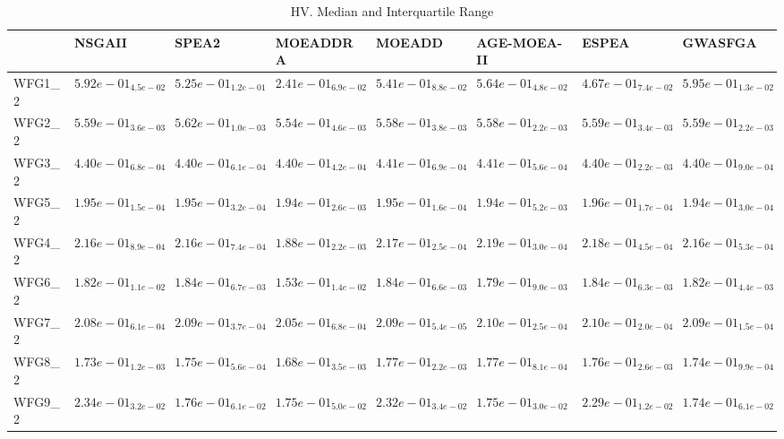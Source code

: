 \documentclass{article}
\begin{document}
\begin{table}
\caption{HV. Median and Interquartile Range}
\label{table: HV}
\centering
\begin{scriptsize}
\begin{tabular}{llllllll}
\hline & NSGAII & SPEA2 & MOEADDRA & MOEADD & AGE-MOEA-II & ESPEA &  GWASFGA\\
\hline 
WFG1\_2 & \cellcolor{gray25}$  5.92e-01_{ 4.5e-02}$ & $  5.25e-01_{ 1.2e-01}$ & $  2.41e-01_{ 6.9e-02}$ & $  5.41e-01_{ 8.8e-02}$ & $  5.64e-01_{ 4.8e-02}$ & $  4.67e-01_{ 7.4e-02}$ & \cellcolor{gray95}$  5.95e-01_{ 1.3e-02}$ \\
WFG2\_2 & $  5.59e-01_{ 3.6e-03}$ & \cellcolor{gray95}$  5.62e-01_{ 1.0e-03}$ & $  5.54e-01_{ 4.6e-03}$ & $  5.58e-01_{ 3.8e-03}$ & $  5.58e-01_{ 2.2e-03}$ & \cellcolor{gray25}$  5.59e-01_{ 3.4e-03}$ & $  5.59e-01_{ 2.2e-03}$ \\
WFG3\_2 & $  4.40e-01_{ 6.8e-04}$ & $  4.40e-01_{ 6.1e-04}$ & $  4.40e-01_{ 4.2e-04}$ & \cellcolor{gray25}$  4.41e-01_{ 6.9e-04}$ & \cellcolor{gray95}$  4.41e-01_{ 5.6e-04}$ & $  4.40e-01_{ 2.2e-03}$ & $  4.40e-01_{ 9.0e-04}$ \\
WFG5\_2 & $  1.95e-01_{ 1.5e-04}$ & \cellcolor{gray25}$  1.95e-01_{ 3.2e-04}$ & $  1.94e-01_{ 2.6e-03}$ & $  1.95e-01_{ 1.6e-04}$ & $  1.94e-01_{ 5.2e-03}$ & \cellcolor{gray95}$  1.96e-01_{ 1.7e-04}$ & $  1.94e-01_{ 3.0e-04}$ \\
WFG4\_2 & $  2.16e-01_{ 8.9e-04}$ & $  2.16e-01_{ 7.4e-04}$ & $  1.88e-01_{ 2.2e-03}$ & $  2.17e-01_{ 2.5e-04}$ & \cellcolor{gray95}$  2.19e-01_{ 3.0e-04}$ & \cellcolor{gray25}$  2.18e-01_{ 4.5e-04}$ & $  2.16e-01_{ 5.3e-04}$ \\
WFG6\_2 & $  1.82e-01_{ 1.1e-02}$ & \cellcolor{gray95}$  1.84e-01_{ 6.7e-03}$ & $  1.53e-01_{ 1.4e-02}$ & \cellcolor{gray25}$  1.84e-01_{ 6.6e-03}$ & $  1.79e-01_{ 9.0e-03}$ & $  1.84e-01_{ 6.3e-03}$ & $  1.82e-01_{ 4.4e-03}$ \\
WFG7\_2 & $  2.08e-01_{ 6.1e-04}$ & $  2.09e-01_{ 3.7e-04}$ & $  2.05e-01_{ 6.8e-04}$ & $  2.09e-01_{ 5.4e-05}$ & \cellcolor{gray95}$  2.10e-01_{ 2.5e-04}$ & \cellcolor{gray25}$  2.10e-01_{ 2.0e-04}$ & $  2.09e-01_{ 1.5e-04}$ \\
WFG8\_2 & $  1.73e-01_{ 1.2e-03}$ & $  1.75e-01_{ 5.6e-04}$ & $  1.68e-01_{ 3.5e-03}$ & \cellcolor{gray25}$  1.77e-01_{ 2.2e-03}$ & \cellcolor{gray95}$  1.77e-01_{ 8.1e-04}$ & $  1.76e-01_{ 2.6e-03}$ & $  1.74e-01_{ 9.9e-04}$ \\
WFG9\_2 & \cellcolor{gray95}$  2.34e-01_{ 3.2e-02}$ & $  1.76e-01_{ 6.1e-02}$ & $  1.75e-01_{ 5.0e-02}$ & \cellcolor{gray25}$  2.32e-01_{ 3.4e-02}$ & $  1.75e-01_{ 3.0e-02}$ & $  2.29e-01_{ 1.2e-02}$ & $  1.74e-01_{ 6.1e-02}$ \\

\end{tabular}
\end{scriptsize}
\end{table}
\end{document}
